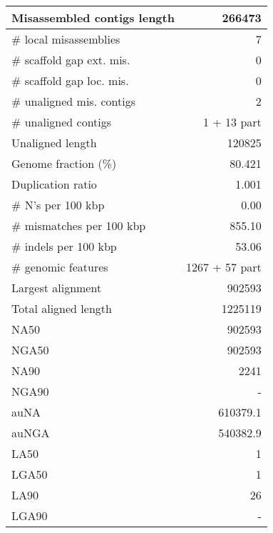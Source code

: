 \documentclass[12pt,a4paper]{article}
\begin{document}
\begin{table}[ht]
\begin{center}
\begin{tabular}{|l*{1}{|r}|}
Misassembled contigs length & 266473 \\ \hline
\# local misassemblies & 7 \\ \hline
\# scaffold gap ext. mis. & 0 \\ \hline
\# scaffold gap loc. mis. & 0 \\ \hline
\# unaligned mis. contigs & 2 \\ \hline
\# unaligned contigs & 1 + 13 part \\ \hline
Unaligned length & 120825 \\ \hline
Genome fraction (\%) & 80.421 \\ \hline
Duplication ratio & 1.001 \\ \hline
\# N's per 100 kbp & 0.00 \\ \hline
\# mismatches per 100 kbp & 855.10 \\ \hline
\# indels per 100 kbp & 53.06 \\ \hline
\# genomic features & 1267 + 57 part \\ \hline
Largest alignment & 902593 \\ \hline
Total aligned length & 1225119 \\ \hline
NA50 & 902593 \\ \hline
NGA50 & 902593 \\ \hline
NA90 & 2241 \\ \hline
NGA90 & - \\ \hline
auNA & 610379.1 \\ \hline
auNGA & 540382.9 \\ \hline
LA50 & 1 \\ \hline
LGA50 & 1 \\ \hline
LA90 & 26 \\ \hline
LGA90 & - \\ \hline
\end{tabular}
\end{center}
\end{table}
\end{document}
